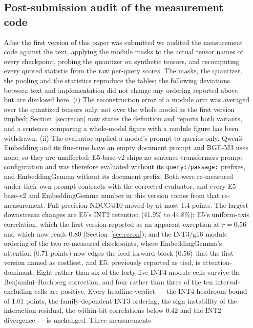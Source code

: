 \documentclass[11pt]{article}
\begin{document}
\subsection{Post-submission audit of the measurement code}
\label{sec:audit}

After the first version of this paper was submitted we audited the measurement code against
the text, applying the module masks to the actual tensor names of every checkpoint, probing
the quantizer on synthetic tensors, and recomputing every quoted statistic from the raw
per-query scores. The masks, the quantizer, the pooling and the statistics reproduce the
tables; the following deviations between text and implementation did not change any ordering
reported above but are disclosed here. (i) The reconstruction error of a module arm was
averaged over the quantized tensors only, not over the whole model as the first version
implied; Section~\ref{sec:recon} now states the definition and reports both variants, and a
sentence comparing a whole-model figure with a module figure has been withdrawn. (ii) The
evaluator applied a model's prompt to queries only. Qwen3-Embedding and its fine-tune have an
empty document prompt and BGE-M3 uses none, so they are unaffected; E5-base-v2 ships no
sentence-transformers prompt configuration and was therefore evaluated without its
\texttt{query:}/\texttt{passage:} prefixes, and EmbeddingGemma without its document prefix.
Both were re-measured under their own prompt contracts with the corrected evaluator, and every
E5-base-v2 and EmbeddingGemma number in this version comes from that re-measurement.
Full-precision NDCG@10 moved by at most 1.4 points. The largest downstream changes are E5's
INT2 retention (41.9\% to 44.8\%); E5's uniform-axis correlation, which the first version
reported as an apparent exception at $r=0.56$ and which now reads $0.80$
(Section~\ref{sec:recon}); and the INT3/g16 module ordering of the two re-measured
checkpoints, where EmbeddingGemma's attention (0.71 points) now edges the feed-forward block
(0.56) that the first version named as costliest, and E5, previously reported as tied, is
attention-dominant. Eight rather than six of the forty-five INT4 module cells survive the
Benjamini--Hochberg correction, and four rather than three of the ten interval-excluding cells
are positive. Every headline verdict --- the INT4 headroom bound of 1.01 points, the
family-dependent INT3 ordering, the sign instability of the interaction residual, the
within-bit correlations below 0.42 and the INT2 divergence --- is unchanged. Three measurements
\end{document}
